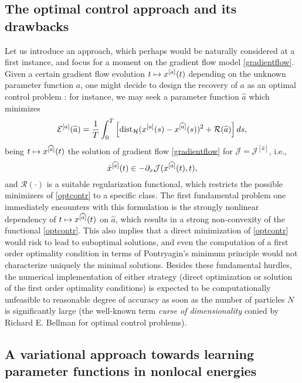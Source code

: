 \subsection{The optimal control approach and its drawbacks}
Let us introduce an approach, which  perhaps would be  naturally  considered at a first instance, and focus for a moment on the gradient flow model \eqref{gradientflow}. Given a certain gradient flow evolution $t \mapsto x^{[a]}(t)$ depending on the unknown parameter function $a$, one might decide to design the recovery of $a$ as an optimal control problem \cite{brpi07}: for instance, we may seek a parameter function $\widehat a$ which minimizes
\begin{equation}\label{optcontr}
\mathcal E^{[a]}(\widehat a) = \frac{1}{T}\int_0^T \left [ \operatorname{dist}_{\mathcal H}(x^{[a]}(s) - x^{[\widehat a]}(s))^2 + \mathcal R(\widehat a) \right ] d s ,
\end{equation}
being $t \mapsto x^{[\widehat a]}(t)$ the solution of gradient flow \eqref{gradientflow} for $\mathcal J = \mathcal J^{[\widehat a]}$, i.e.,
\begin{equation}\label{gradientflow2}
\dot{x}^{[\widehat a]}(t) \in - \partial_x \mathcal J(x^{[\widehat a]}(t),t),
\end{equation}
and $\mathcal R(\cdot)$ is a suitable regularization functional, which restricts the possible minimizers of \eqref{optcontr} to a specific class. The first fundamental problem one immediately encounters with this formulation is the strongly nonlinear dependency of $t \mapsto x^{[\widehat a]}(t)$ on $\widehat a$, which results in a strong non-convexity of the functional \eqref{optcontr}. This also implies that a direct minimization of \eqref{optcontr} would risk to lead to suboptimal solutions, and even the computation of a first order optimality condition in terms of Pontryagin's minimum principle would not characterize uniquely the minimal solutions. Besides these fundamental hurdles, the numerical implementation of either strategy (direct optimization or solution of the first order optimality conditions) is expected to be computationally unfeasible to reasonable degree of accuracy as soon as the number of particles $N$ is significantly large (the well-known term {\it curse of dimensionality} conied by Richard E. Bellman for optimal control problems).

\subsection{A variational approach towards learning parameter functions in nonlocal energies}\label{sec:wp2}

